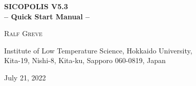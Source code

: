 \documentclass[12pt,a4paper]{article}
\begin{document}
\begin{center}

\rule{0mm}{15mm}

\begin{huge}
  \textbf{SICOPOLIS V5.3\\[-0.5ex]
          -- Quick Start Manual --}\\[-0.5ex]
\end{huge}

\rule{0mm}{25mm}

\begin{Large}
  \textsc{Ralf Greve}
\end{Large}

\rule{0mm}{15mm}

\begin{large}
  Institute of Low Temperature Science, Hokkaido University,\\[-0.25ex]
  Kita-19, Nishi-8, Kita-ku, Sapporo 060-0819, Japan\\[1ex]
\end{large}

\vfill


\begin{large}July 21, 2022\end{large}

\end{center}

\rule{0mm}{20mm}

\clearpage

\rule{0mm}{0mm}

\vfill
\end{document}
